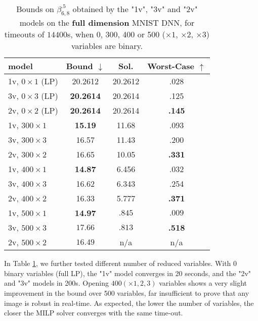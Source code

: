 	
	\begin{table}[h!]
		\centering
	\begin{tabular}{||l||c|c|c||}\hline\hline
		model &        Bound $\downarrow$ &  Sol. &      Worst-Case $\uparrow$ \\\hline \hline
		1v, $0 \times 1$ (LP) & 20.2612  & 20.2612  & .028 \\\hline 
		3v, $0 \times 3$ (LP) & {\bf 20.2614}  & 20.2614  & .125 \\\hline 
	    2v, $0 \times 2$ (LP) & {\bf 20.2614}  & 20.2614  & {\bf .145} \\\hline\hline	 


		1v, $300 \times 1$ & {\bf 15.19} & 11.68 & .093 \\\hline 
		3v, $300 \times 3$ & 16.57 & 11.43 & .200 \\\hline 
	    2v, $300 \times 2$ & 16.65 & 10.05 & {\bf .331} \\\hline\hline	 

		1v, $400 \times 1$ & {\bf 14.87} & 6.456 & .032 \\\hline 
		3v, $400 \times 3$ & 16.62 & 6.343 & .254 \\\hline 
	    2v, $400 \times 2$ & 16.33 & 5.777 & {\bf .371} \\\hline \hline

		1v, $500 \times 1$ & {\bf 14.97} & $.845$ & $.009$ \\\hline 
		3v, $500 \times 3$ & $17.66$ & $.813$ & {\bf .518} \\\hline 
	    2v, $500 \times 2$ & $16.49$ & n/a & n/a \\\hline\hline	 
	\end{tabular}
	\caption{Bounds on $\beta^{.5}_{6,8}$ 
	obtained by the "1v", "3v" and "2v" models 
	on the {\bf full dimension} MNIST DNN, 
	for timeouts of $14400$s, when 0, 300, 400 or 500 ($\times 1$, $\times 2$, $\times 3$) variables are binary.}
	\label{table.mnist}
\end{table}

In Table \ref{table.mnist}, we further tested different number of reduced variables. 
With 0 binary variables (full LP), the "1v" model converges in 20 seconds, and the "2v" and "3v" models in 200s.
Opening $400 (\times 1,2,3)$ variables shows a very slight improvement in the bound over 500 variables, 
far insufficient to prove that any image is robust in real-time. As expected, the lower the number of variables, the closer the MILP solver converges with the same time-out.


